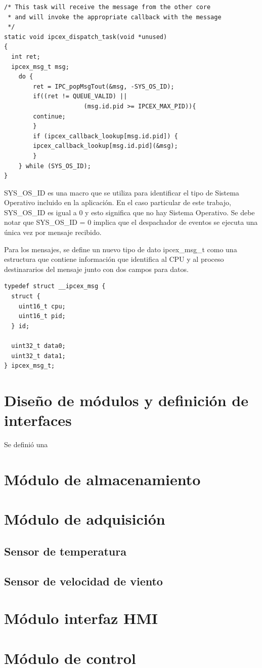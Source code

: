 \begin{verbatim}
/* This task will receive the message from the other core
 * and will invoke the appropriate callback with the message
 */
static void ipcex_dispatch_task(void *unused)
{
  int ret;
  ipcex_msg_t msg;
  	do {
    	ret = IPC_popMsgTout(&msg, -SYS_OS_ID);
    	if((ret != QUEUE_VALID) || 
                      (msg.id.pid >= IPCEX_MAX_PID)){
      	continue;
    	}
    	if (ipcex_callback_lookup[msg.id.pid]) {
      	ipcex_callback_lookup[msg.id.pid](&msg);
    	}
  	} while (SYS_OS_ID);
}
\end{verbatim}

SYS\_OS\_ID es una macro que se utiliza para identificar el tipo de Sistema Operativo incluido en la aplicación.  En el caso particular de este trabajo, SYS\_OS\_ID es igual a 0 y esto significa que no hay Sistema Operativo.  Se debe notar que SYS\_OS\_ID = 0 implica que el despachador de eventos se ejecuta una única vez por mensaje recibido.

Para los mensajes, se define un nuevo tipo de dato ipcex\_msg\_t como una estructura que contiene información que identifica al CPU y al proceso destinararios del mensaje junto con dos campos para datos.

\begin{verbatim}
typedef struct __ipcex_msg {
  struct {
    uint16_t cpu;
    uint16_t pid;
  } id;

  uint32_t data0;
  uint32_t data1;
} ipcex_msg_t;
\end{verbatim}

\section{Diseño de módulos y definición de interfaces}
\label{sec:modulos}

Se definió una 

\section{Módulo de almacenamiento}
\label{sec:almacenamiento}

\section{Módulo de adquisición}
\label{sec:adquisicion}

\subsection{Sensor de temperatura}
\label{subsec:1-wire}

\subsection{Sensor de velocidad de viento}
\label{subsec:anemometro}

\section{Módulo interfaz HMI}
\label{sec:HMI}

\section{Módulo de control}
\label{control}
